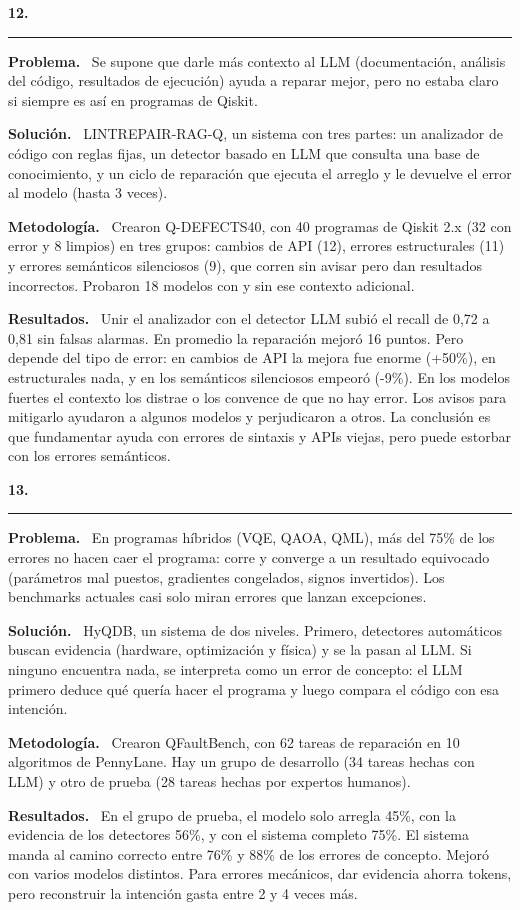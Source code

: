 \documentclass[11pt,a4paper]{article}
\newcommand{\paper}[1]{\vspace{1.2em}\par{\large\textbf{#1}}\par\vspace{0.2em}\hrule\vspace{0.4em}}
\newcommand{\parte}[1]{\par\textbf{#1.}\ }
\begin{document}
\paper{12.}

\parte{Problema}
Se supone que darle más contexto al LLM (documentación, análisis del código, resultados de ejecución) ayuda a reparar mejor, pero no estaba claro si siempre es así en programas de Qiskit.

\parte{Solución}
LINTREPAIR-RAG-Q, un sistema con tres partes: un analizador de código con reglas fijas, un detector basado en LLM que consulta una base de conocimiento, y un ciclo de reparación que ejecuta el arreglo y le devuelve el error al modelo (hasta 3 veces).

\parte{Metodología}
Crearon Q-DEFECTS40, con 40 programas de Qiskit 2.x (32 con error y 8 limpios) en tres grupos: cambios de API (12), errores estructurales (11) y errores semánticos silenciosos (9), que corren sin avisar pero dan resultados incorrectos. Probaron 18 modelos con y sin ese contexto adicional.

\parte{Resultados}
Unir el analizador con el detector LLM subió el recall de 0,72 a 0,81 sin falsas alarmas. En promedio la reparación mejoró 16 puntos. Pero depende del tipo de error: en cambios de API la mejora fue enorme (+50\%), en estructurales nada, y en los semánticos silenciosos empeoró (-9\%). En los modelos fuertes el contexto los distrae o los convence de que no hay error. Los avisos para mitigarlo ayudaron a algunos modelos y perjudicaron a otros. La conclusión es que fundamentar ayuda con errores de sintaxis y APIs viejas, pero puede estorbar con los errores semánticos.

\paper{13.}

\parte{Problema}
En programas híbridos (VQE, QAOA, QML), más del 75\% de los errores no hacen caer el programa: corre y converge a un resultado equivocado (parámetros mal puestos, gradientes congelados, signos invertidos). Los benchmarks actuales casi solo miran errores que lanzan excepciones.

\parte{Solución}
HyQDB, un sistema de dos niveles. Primero, detectores automáticos buscan evidencia (hardware, optimización y física) y se la pasan al LLM. Si ninguno encuentra nada, se interpreta como un error de concepto: el LLM primero deduce qué quería hacer el programa y luego compara el código con esa intención.

\parte{Metodología}
Crearon QFaultBench, con 62 tareas de reparación en 10 algoritmos de PennyLane. Hay un grupo de desarrollo (34 tareas hechas con LLM) y otro de prueba (28 tareas hechas por expertos humanos).

\parte{Resultados}
En el grupo de prueba, el modelo solo arregla 45\%, con la evidencia de los detectores 56\%, y con el sistema completo 75\%. El sistema manda al camino correcto entre 76\% y 88\% de los errores de concepto. Mejoró con varios modelos distintos. Para errores mecánicos, dar evidencia ahorra tokens, pero reconstruir la intención gasta entre 2 y 4 veces más.
\end{document}
